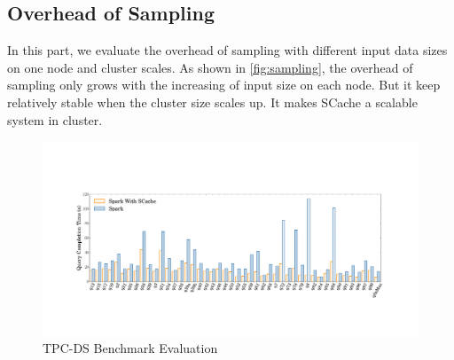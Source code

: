 \subsection{Overhead of Sampling}
In this part, we evaluate the overhead of sampling with different input data sizes on one node and cluster scales. As shown in \ref{fig:sampling}, the overhead of sampling only grows with the increasing of input size on each node. But it keep relatively stable when the cluster size scales up. It makes SCache a scalable system in cluster.
\begin{figure}
	\includegraphics[width=\textwidth]{fig/tpcds}
	\caption{TPC-DS Benchmark Evaluation}
	\label{fig:tpcds}
\end{figure}


